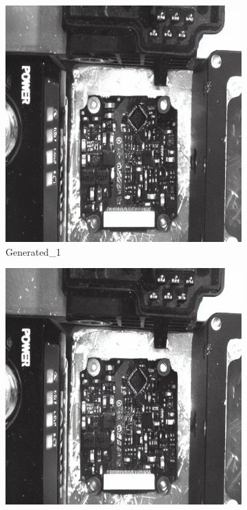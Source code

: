 \documentclass[12pt,DIV14,BCOR12mm,a4paper,footinclude=false,headinclude,parskip=half-,twoside,openright,cleardoublepage=empty,toc=index,bibliography=totoc,listof=totoc]{scrreprt}
\numberwithin{equation}{chapter}
\begin{document}
\begin{figure}
    \begin{minipage}[H]{\linewidth}
        \centering
        \begin{minipage}[H]{0.5\linewidth} %
            \centering
            \begin{subfigure}[t]{0.48\linewidth}
                \centering
                \includegraphics[width=\linewidth]{../media/pcb_generated_1_1.png}
                \caption{Generated\_1}
            \end{subfigure}%
            \hfill
            \begin{subfigure}[t]{0.48\linewidth}
                \centering
                \includegraphics[width=\linewidth]{../media/pcb_generated_1_2.png}

\end{subfigure}
\end{minipage}
\end{minipage}
\end{figure}
\end{document}
